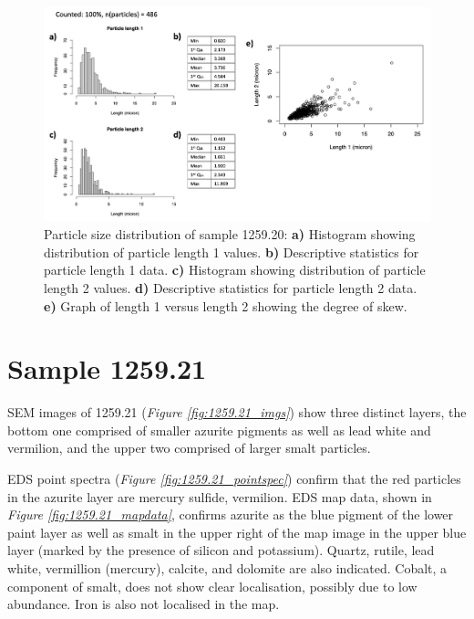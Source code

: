 \begin{figure}[H]
\centering
  \includegraphics[width=\linewidth]{1259-20_partsize}
\caption[Particle size distribution, sample 1259.20.]{Particle size distribution of sample 1259.20: \textbf{a)} Histogram showing distribution of particle length 1 values. \textbf{b)} Descriptive statistics for particle length 1 data. \textbf{c)} Histogram showing distribution of particle length 2 values. \textbf{d)} Descriptive statistics for particle length 2 data. \textbf{e)} Graph of length 1 versus length 2 showing the degree of skew.}
\label{fig:1259.20_partsize}
\end{figure}



\section{Sample 1259.21}

SEM images of 1259.21 (\textit{Figure \ref{fig:1259.21_imgs}}) show three distinct layers, the bottom one comprised of smaller azurite pigments as well as lead white and vermilion, and the upper two comprised of larger smalt particles. 

EDS point spectra (\textit{Figure \ref{fig:1259.21_pointspec}}) confirm that the red particles in the azurite layer are mercury sulfide, vermilion. EDS map data, shown in \textit{Figure \ref{fig:1259.21_mapdata}}, confirms azurite as the blue pigment of the lower paint layer as well as smalt in the upper right of the map image in the upper blue layer (marked by the presence of silicon and potassium). Quartz, rutile, lead white, vermillion (mercury), calcite, and dolomite are also indicated. Cobalt, a component of smalt, does not show clear localisation, possibly due to low abundance. Iron is also not localised in the map.

